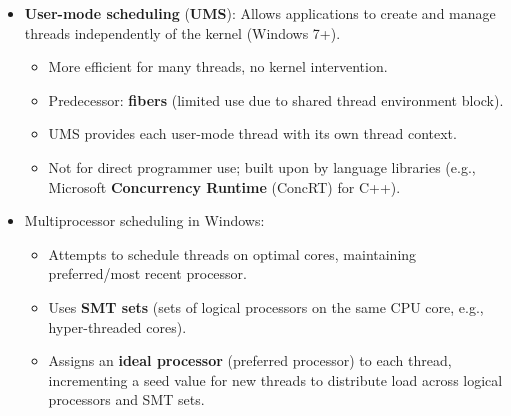 \begin{itemize}
\begin{itemize}
        \end{itemize}
    \item \textbf{User-mode scheduling} (\textbf{UMS}): Allows applications to create and manage threads independently of the kernel (Windows 7+).
        \begin{itemize}
            \item More efficient for many threads, no kernel intervention.
            \item Predecessor: \textbf{fibers} (limited use due to shared thread environment block).
            \item UMS provides each user-mode thread with its own thread context.
            \item Not for direct programmer use; built upon by language libraries (e.g., Microsoft \textbf{Concurrency Runtime} (ConcRT) for C++).
        \end{itemize}
    \item Multiprocessor scheduling in Windows:
        \begin{itemize}
            \item Attempts to schedule threads on optimal cores, maintaining preferred/most recent processor.
            \item Uses \textbf{SMT sets} (sets of logical processors on the same CPU core, e.g., hyper-threaded cores).
            \item Assigns an \textbf{ideal processor} (preferred processor) to each thread, incrementing a seed value for new threads to distribute load across logical processors and SMT sets.
        \end{itemize}
\end{itemize}

